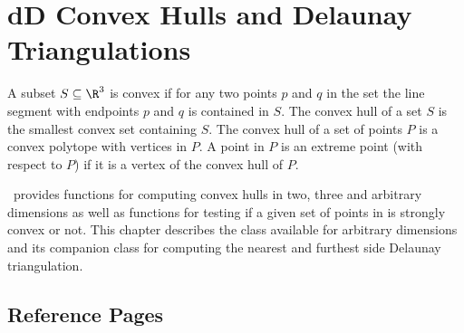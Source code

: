 
\chapter{dD Convex Hulls and Delaunay Triangulations}
\label{chap:convex_hull_d_ref}

A subset $S \subseteq \R^3$ is convex if for any two points $p$ and $q$
in the set the line segment with endpoints $p$ and $q$ is contained
in $S$. The convex hull of a set $S$ is 
the smallest convex set containing
$S$. The convex hull of a set of points $P$ is a convex 
polytope with vertices in $P$.  A point in $P$ is an extreme point 
(with respect to $P$) if it is a vertex 
of the convex hull of $P$.

\cgal\ provides functions for computing convex hulls in two, three 
and arbitrary dimensions as well as functions for testing if a given set of 
points in is strongly convex or not.  This chapter describes the class
available for arbitrary dimensions and its companion class for 
computing the nearest and furthest side Delaunay triangulation. 

\section{Reference Pages}


 \\
 \\
 \\


 \\
  \\

\clearpage


